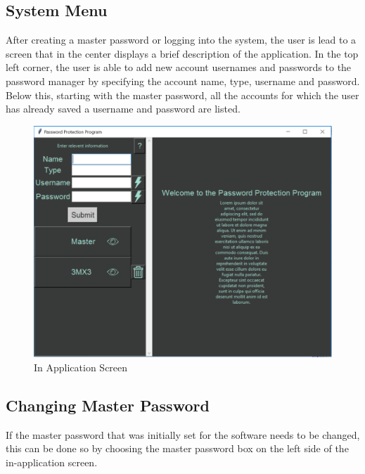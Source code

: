 \documentclass[12pt, titlepage]{article}
\begin{document}
\newpage 
\subsection{System Menu} \label{SysMenu}

After creating a master password or logging into the system, the user is lead to a screen that in the center displays a brief description of the application. In the top left corner, the user is able to add new account usernames and passwords to the password manager by specifying the account name, type, username and password. Below this, starting with the master password, all the accounts for which the user has already saved a username and password are listed. 


\begin{figure}[h]
	\centering
	\includegraphics[scale=1.0]{images/InAppScreen.PNG}
	\caption{In Application Screen}
	\label{fig:InApp}
\end{figure}

\newpage
\subsection{Changing Master Password} \label{ChangeMasPass}

If the master password that was initially set for the software needs to be changed, this can be done so by choosing the master password box on the left side of the in-application screen.
\end{document}
